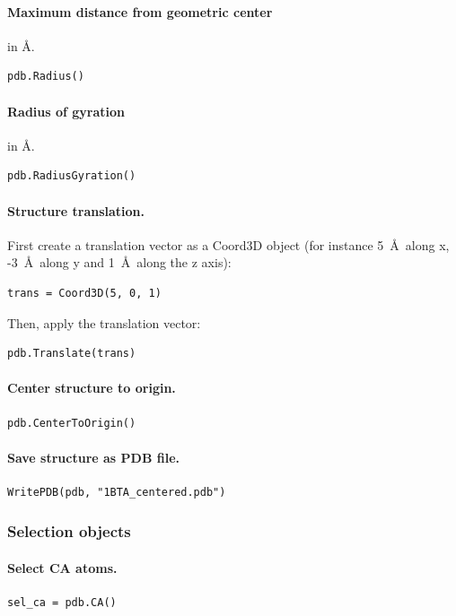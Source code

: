 \documentclass[12pt,a4paper]{article}
\begin{document}
\paragraph{Maximum distance from geometric center} in \AA.
\begin{verbatim}
pdb.Radius()
\end{verbatim}


\paragraph{Radius of gyration} in \AA.
\begin{verbatim}
pdb.RadiusGyration()
\end{verbatim}


\paragraph{Structure translation.}
First create a translation vector as a Coord3D object (for instance 5~\AA\ along x, 
-3~\AA\ along y and 1~\AA\ along the z axis):
\begin{verbatim}
trans = Coord3D(5, 0, 1)
\end{verbatim}
Then, apply the translation vector:
\begin{verbatim}
pdb.Translate(trans)
\end{verbatim}


\paragraph{Center structure to origin.}
\begin{verbatim}
pdb.CenterToOrigin()
\end{verbatim}


\paragraph{Save structure as PDB file.}
\begin{verbatim}
WritePDB(pdb, "1BTA_centered.pdb")
\end{verbatim}


\subsubsection{Selection objects}

\paragraph{Select CA atoms.}
\begin{verbatim}
sel_ca = pdb.CA()
\end{verbatim}
\end{document}
